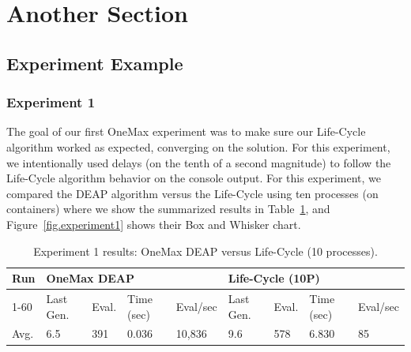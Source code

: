 \documentclass[graybox]{svmult}
\begin{document}

\section{Another Section}
\label{section.another_section}

\subsection{Experiment Example}

\subsubsection{Experiment 1} The goal of our first OneMax experiment was to
make sure our Life-Cycle algorithm worked as expected, converging on the
solution. For this experiment, we intentionally used delays (on the tenth of a
second magnitude) to follow the Life-Cycle algorithm behavior on the console
output. For this experiment, we compared the DEAP algorithm versus the
Life-Cycle using ten processes (on containers) where we show the summarized
results in Table~\ref{tab.experiment1}, and Figure~\ref{fig.experiment1} shows
their Box and Whisker chart.

\begin{table}[]
    \centering        
    \caption{Experiment 1 results: OneMax DEAP versus Life-Cycle (10 processes).}\label{tab.experiment1}
    \begin{tabular}{|l|l|l|l|l|l|l|l|l|}
    \hline
    Run & \multicolumn{4}{l|}{OneMax DEAP} & \multicolumn{4}{l|}{Life-Cycle (10P)} \\ \hline
    1-60 & Last Gen. & Eval. & Time (sec) & Eval/sec & Last Gen. & Eval. & Time (sec) & Eval/sec \\ \hline
    Avg. & 6.5 & 391 & 0.036 & 10,836 & 9.6 & 578 & 6.830 & 85 \\ \hline
    \end{tabular}
    \end{table}
\end{document}

